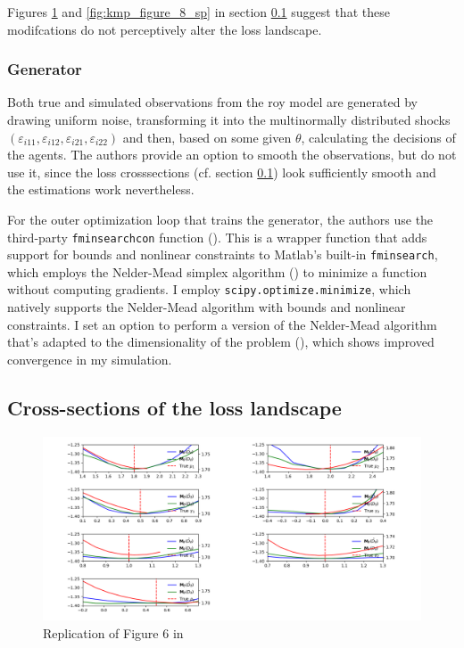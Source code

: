 Figures \ref{fig:kmp_figure_6} and \ref{fig:kmp_figure_8_sp} in section \ref{sec:cross_loss} suggest that these modifcations do not perceptively alter the loss landscape.

\subsubsection{Generator}

Both true and simulated observations from the roy model are generated by drawing uniform noise, transforming it into the multinormally distributed shocks $(\varepsilon_{i 11}, \varepsilon_{i 12}, \varepsilon_{i 21}, \varepsilon_{i 22})$ and then, based on some given $\theta$, calculating the decisions of the agents.
The authors provide an option to smooth the observations, but do not use it, since the loss crosssections (cf. section \ref{sec:cross_loss}) look sufficiently smooth and the estimations work nevertheless.

For the outer optimization loop that trains the generator, the authors use the third-party \mbox{\texttt{fminsearchcon}} function (\textcite{DErrico2024}).
This is a wrapper function that adds support for bounds and nonlinear constraints to Matlab's built-in \texttt{fminsearch}, which employs the Nelder-Mead simplex algorithm (\textcite{lagarias1998convergence}) to minimize a function without computing gradients.
I employ \texttt{scipy.optimize.minimize}, which natively supports the Nelder-Mead algorithm with bounds and nonlinear constraints.
I set an option to perform a version of the Nelder-Mead algorithm that's adapted to the dimensionality of the problem (\cite{gao2012implementing}), which shows improved convergence in my simulation. %

\subsection{Cross-sections of the loss landscape}
\label{sec:cross_loss}

\begin{figure}
    \includegraphics[width=\textwidth]{./Images/kmp_figure_6.png}
    \caption{Replication of Figure 6 in \cite{kaji2023adversarial}}
    \label{fig:kmp_figure_6}
\end{figure}

